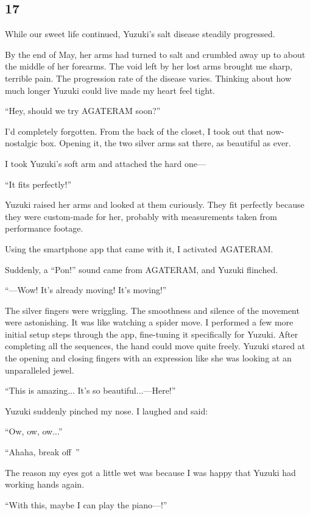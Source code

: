 \documentclass[
    a4paper,
    12pt,
    twoside,
    openany,
    UTF8,
    fontset=windows
]{ctexbook}
\begin{document}
\subsection*{17}

While our sweet life continued, Yuzuki's salt disease steadily progressed.

By the end of May, her arms had turned to salt and crumbled away up to about the middle of her forearms. The void left by her lost arms brought me sharp, terrible pain. The progression rate of the disease varies. Thinking about how much longer Yuzuki could live made my heart feel tight.

``Hey, should we try AGATERAM soon?''

I'd completely forgotten. From the back of the closet, I took out that now-nostalgic box. Opening it, the two silver arms sat there, as beautiful as ever.

I took Yuzuki's soft arm and attached the hard one---

``It fits perfectly!''

Yuzuki raised her arms and looked at them curiously. They fit perfectly because they were custom-made for her, probably with measurements taken from performance footage.

Using the smartphone app that came with it, I activated AGATERAM.

Suddenly, a ``Pon!'' sound came from AGATERAM, and Yuzuki flinched.

``---Wow! It's already moving! It's moving!''

The silver fingers were wriggling. The smoothness and silence of the movement were astonishing. It was like watching a spider move. I performed a few more initial setup steps through the app, fine-tuning it specifically for Yuzuki. After completing all the sequences, the hand could move quite freely. Yuzuki stared at the opening and closing fingers with an expression like she was looking at an unparalleled jewel.

``This is amazing... It's so beautiful...---Here!''

Yuzuki suddenly pinched my nose. I laughed and said:

``Ow, ow, ow...''

``Ahaha, break off~''

The reason my eyes got a little wet was because I was happy that Yuzuki had working hands again.

``With this, maybe I can play the piano---!''
\end{document}
